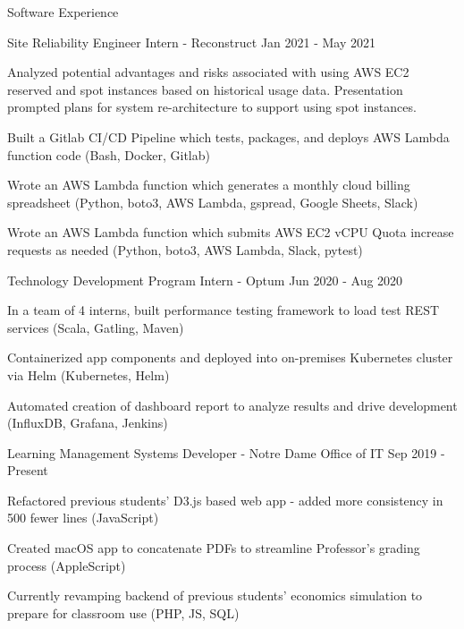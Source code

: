 \documentclass[10pt]{resume} %
\begin{document}
\begin{rSection}{ Software Experience }

\begin{rSubsection}{ Site Reliability Engineer Intern - Reconstruct }{ Jan 2021 - May 2021 }{}{}
\item Analyzed potential advantages and risks associated with using AWS EC2 reserved and spot instances based on historical usage data. Presentation prompted plans for system re-architecture to support using spot instances.
\item Built a Gitlab CI/CD Pipeline which tests, packages, and deploys AWS Lambda function code (Bash, Docker, Gitlab)
\item Wrote an AWS Lambda function which generates a monthly cloud billing spreadsheet (Python, boto3, AWS Lambda, gspread, Google Sheets, Slack)
\item Wrote an AWS Lambda function which submits AWS EC2 vCPU Quota increase requests as needed (Python, boto3, AWS Lambda, Slack, pytest)
\end{rSubsection}

\begin{rSubsection}{ Technology Development Program Intern - Optum }{ Jun 2020 - Aug 2020 }{}{}
\item In a team of 4 interns, built performance testing framework to load test REST services (Scala, Gatling, Maven)
\item Containerized app components and deployed into on-premises Kubernetes cluster via Helm (Kubernetes, Helm)
\item Automated creation of dashboard report to analyze results and drive development (InfluxDB, Grafana, Jenkins)
\end{rSubsection}

\begin{rSubsection}{ Learning Management Systems Developer - Notre Dame Office of IT }{ Sep 2019 - Present }{}{}
\item Refactored previous students' D3.js based web app - added more consistency in 500 fewer lines (JavaScript)
\item Created macOS app to concatenate PDFs to streamline Professor's grading process (AppleScript)
\item Currently revamping backend of previous students' economics simulation to prepare for classroom use (PHP, JS, SQL)
\end{rSubsection}


\end{rSection}
\end{document}
